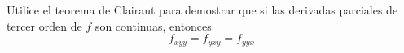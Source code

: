 \item Utilice el teorema de Clairaut para demostrar que si las derivadas parciales de tercer orden de $f$ son continuas, entonces
\[ f_{xyy} = f_{yxy} = f_{yyx} \]
